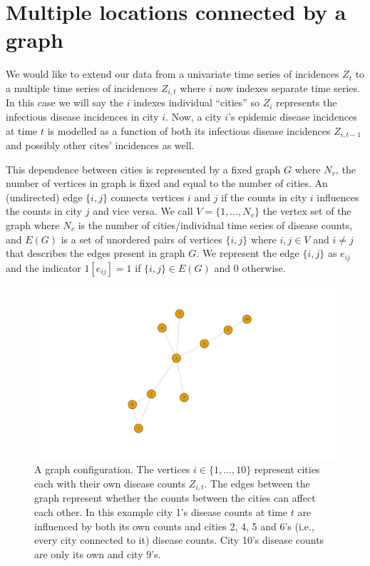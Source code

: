 \documentclass[11pt,a4paper]{article}
\numberwithin{equation}{section}
\begin{document}
\hypertarget{multiple-locations-connected-by-a-graph}{%
\section{Multiple locations connected by a
graph}\label{multiple-locations-connected-by-a-graph}}

We would like to extend our data from a univariate time series of
incidences \(Z_t\) to a multiple time series of incidences \(Z_{i,t}\)
where \(i\) now indexes separate time series. In this case we will say
the \(i\) indexes individual ``cities'' so \(Z_i\) represents the
infectious disease incidences in city \(i\). Now, a city \(i\)'s
epidemic disease incidences at time \(t\) is modelled as a function of
both its infectious disease incidences \(Z_{i,t-1}\) and possibly other
cites' incidences as well.

This dependence between cities is represented by a fixed graph \(G\)
where \(N_v\), the number of vertices in graph is fixed and equal to the
number of cities. An (undirected) edge \(\{i,j\}\) connects vertices
\(i\) and \(j\) if the counts in city \(i\) influences the counts in
city \(j\) and vice versa. We call \(V = \{1,\dots,N_v \}\) the vertex
set of the graph where \(N_v\) is the number of cities/individual time
series of disease counts, and \(E(G)\) is a set of unordered pairs of
vertices \(\{i,j\}\) where \(i,j \in V\) and \(i \neq j\) that describes
the edges present in graph \(G\). We represent the edge \(\{i,j\}\) as
\(e_{ij}\) and the indicator \(1[e_{ij}]=1\) if \(\{i,j\} \in E(G)\) and
0 otherwise.

\begin{figure}
\includegraphics[trim={1 2cm 0 2cm},clip]{thesis_draft_files/figure-latex/unnamed-chunk-1-1} \caption{\label{fig:graph example} A graph configuration. The vertices $i \in \{1,\dots, 10\}$ represent cities each with their own disease counts $Z_{i,t}$. The edges between the graph represent whether the counts between the cities can affect each other. In this example city 1's disease counts at time $t$ are influenced by both its own counts and cities 2, 4, 5 and 6's (i.e., every city connected to it) disease counts. City 10's disease counts are only its own and city 9's.}\label{fig:unnamed-chunk-1}
\end{figure}
\end{document}
